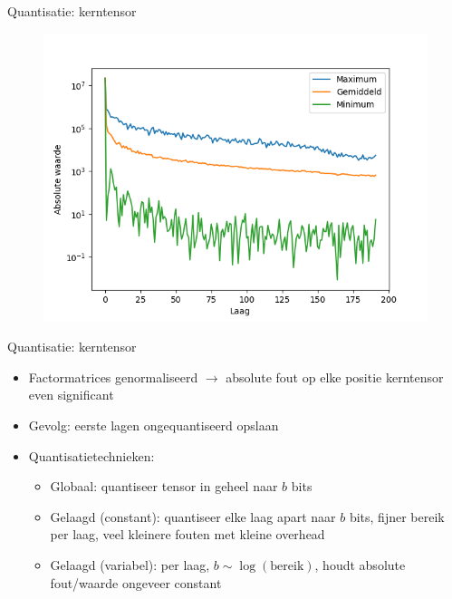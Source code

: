 \documentclass[t,12pt,dutch
\ifx\beamermode\undefined\else,\beamermode\fi
]{beamer}
\begin{document}
\begin{frame}{Quantisatie: kerntensor}

\begin{figure}[H]
\centering
\includegraphics[scale=0.5]{images/core_tensor_values_distribution.png}
\end{figure}

\end{frame}

\begin{frame}{Quantisatie: kerntensor}
\begin{itemize}
\item Factormatrices genormaliseerd $\rightarrow$ absolute fout op elke positie kerntensor even significant
\item Gevolg: eerste lagen ongequantiseerd opslaan
\item Quantisatietechnieken:
\begin{itemize}
\item Globaal: quantiseer tensor in geheel naar $b$ bits
\item Gelaagd (constant): quantiseer elke laag apart naar $b$ bits, fijner bereik per laag, veel kleinere fouten met kleine overhead
\item Gelaagd (variabel): per laag, $b \sim \log{(\text{bereik})}$, houdt absolute fout/waarde ongeveer constant
\end{itemize}
\end{itemize}
\end{frame}
\end{document}
